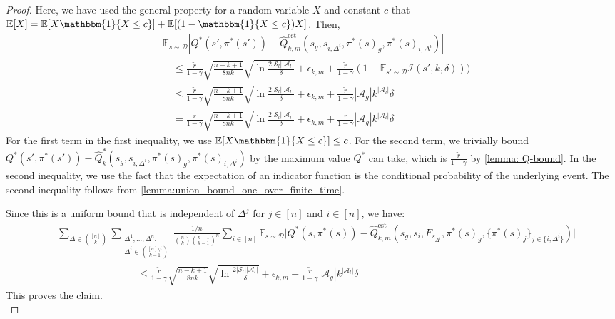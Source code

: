 \documentclass{article}
\theoremstyle{plain}
\theoremstyle{definition}
\def\est{\mathrm{est}}
\def\E{\mathbb{E}}
\begin{document}
\begin{proof}
Here, we have used the general property for a random variable $X$ and constant $c$ that $\E[X]=\E[X\mathbbm{1}\{X\leq c\}] + \E[(1-\mathbbm{1}\{X\leq c\})X]$. 
Then,
\begin{align*}
    &\E_{s\sim \mathcal{D}}\left|Q^*(s',\pi^*(s'))-\hat{Q}_{k,m}^\est(s_g, s_{i,\Delta^i}, \pi^*(s)_g, \pi^*(s)_{i,\Delta^i})\right| \\
    &\quad\leq \frac{\tilde{r}}{1-\gamma}\sqrt{\frac{n-k+1}{8nk}}\sqrt{\ln\frac{2|\mathcal{S}_l||\mathcal{A}_l|}{\delta}} + \epsilon_{k,m}+ \frac{\tilde{r}}{1-\gamma}\left(1-\E_{s'\sim\mathcal{D}} \mathcal{I}(s',k,\delta)\right))\\
    &\quad\leq \frac{\tilde{r}}{1-\gamma}\sqrt{\frac{n-k+1}{8nk}} \sqrt{\ln\frac{2|\mathcal{S}_l||\mathcal{A}_l|}{\delta}}  +\epsilon_{k,m} +  \frac{\tilde{r}}{1-\gamma}|\mathcal{A}_g|k^{|\mathcal{A}_l|}\delta \\
    &\quad= \frac{\tilde{r}}{1-\gamma}\sqrt{\frac{n-k+1}{8nk}} \sqrt{\ln\frac{2|\mathcal{S}_l||\mathcal{A}_l|}{\delta}}  +\epsilon_{k,m} +  \frac{\tilde{r}}{1-\gamma}|\mathcal{A}_g|k^{|\mathcal{A}_l|}\delta
\end{align*}For the first term in the first inequality, we use  $\E[X\mathbbm{1}\{X\leq c\}] \leq c$. For the second term, we trivially bound $Q^*(s',\pi^*(s'))-\hat{Q}_k^*(s_g, s_{i,\Delta^i}, \pi^*(s)_g, \pi^*(s)_{i,\Delta^i})$ by the maximum value $Q^*$ can take, which is $\frac{\tilde{r}}{1-\gamma}$ by \cref{lemma: Q-bound}. In the second inequality, we use the fact that the expectation of an indicator function is the conditional probability of the underlying event. The second inequality follows from \cref{lemma:union_bound_one_over_finite_time}.

Since this is a uniform bound that is independent of $\Delta^j$ for $j\in[n]$ and $i\in[n]$, we have:
\begin{align*}
&\!\!\sum_{\Delta\in {[n]\choose k}}\! \sum_{\substack{\Delta^1,\dots,\Delta^n:\\ \Delta^i \in {[n]\setminus i\choose k-1}}} \!\frac{1/n}{{n\choose k} {n-1 \choose k-1}^n}\!\sum_{i\in[n]}\mathbb{E}_{s\sim \mathcal{D}}\bigg|Q^*(s, \pi^*(s))\!-\! \hat{Q}_{k,m}^\est(s_g, s_i, F_{s_{\Delta^i}}, \pi^*(s)_g, \{\pi^*(s)_j\}_{j\in\{i,\Delta^i\}})\bigg|\\
&\quad\quad\quad\quad\quad\quad\quad\quad\leq \frac{\tilde{r}}{1-\gamma}\sqrt{\frac{n-k+1}{8nk}} \sqrt{\ln\frac{2|\mathcal{S}_l||\mathcal{A}_l|}{\delta}} +\epsilon_{k,m} +  \frac{\tilde{r}}{1-\gamma}|\mathcal{A}_g|k^{|\mathcal{A}_l|}\delta
\end{align*}
This proves the claim.\qedhere \\
\end{proof}
\end{document}
